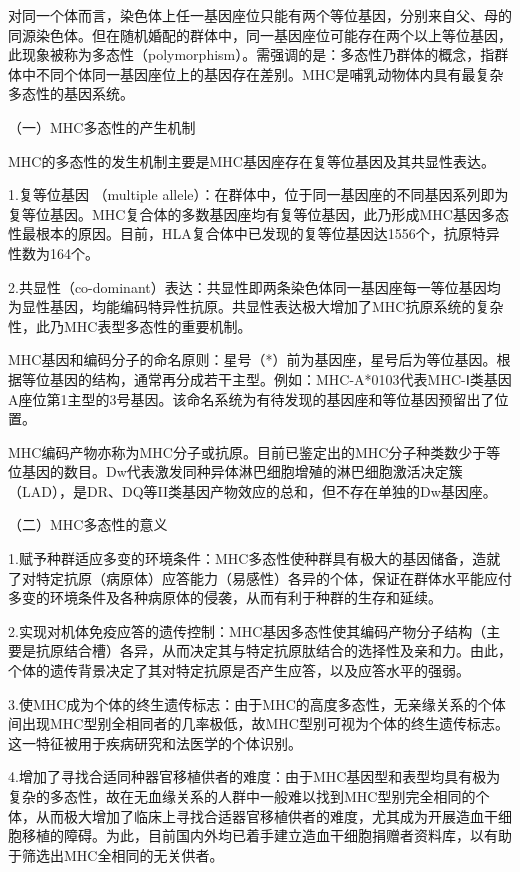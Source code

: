 对同一个体而言，染色体上任一基因座位只能有两个等位基因，分别来自父、母的同源染色体。但在随机婚配的群体中，同一基因座位可能存在两个以上等位基因，此现象被称为多态性（polymorphism）。需强调的是：多态性乃群体的概念，指群体中不同个体同一基因座位上的基因存在差别。MHC是哺乳动物体内具有最复杂多态性的基因系统。

（一）MHC多态性的产生机制

MHC的多态性的发生机制主要是MHC基因座存在复等位基因及其共显性表达。

1.复等位基因 （multiple
allele）：在群体中，位于同一基因座的不同基因系列即为复等位基因。MHC复合体的多数基因座均有复等位基因，此乃形成MHC基因多态性最根本的原因。目前，HLA复合体中已发现的复等位基因达1556个，抗原特异性数为164个。

2.共显性（co-dominant）表达：共显性即两条染色体同一基因座每一等位基因均为显性基因，均能编码特异性抗原。共显性表达极大增加了MHC抗原系统的复杂性，此乃MHC表型多态性的重要机制。

MHC基因和编码分子的命名原则：星号（*）前为基因座，星号后为等位基因。根据等位基因的结构，通常再分成若干主型。例如：MHC-A*0103代表MHC-Ⅰ类基因A座位第1主型的3号基因。该命名系统为有待发现的基因座和等位基因预留出了位置。

MHC编码产物亦称为MHC分子或抗原。目前已鉴定出的MHC分子种类数少于等位基因的数目。Dw代表激发同种异体淋巴细胞增殖的淋巴细胞激活决定簇
（LAD），是DR、DQ等II类基因产物效应的总和，但不存在单独的Dw基因座。

（二）MHC多态性的意义

1.赋予种群适应多变的环境条件：MHC多态性使种群具有极大的基因储备，造就了对特定抗原（病原体）应答能力（易感性）各异的个体，保证在群体水平能应付多变的环境条件及各种病原体的侵袭，从而有利于种群的生存和延续。

2.实现对机体免疫应答的遗传控制：MHC基因多态性使其编码产物分子结构（主要是抗原结合槽）各异，从而决定其与特定抗原肽结合的选择性及亲和力。由此，个体的遗传背景决定了其对特定抗原是否产生应答，以及应答水平的强弱。

3.使MHC成为个体的终生遗传标志：由于MHC的高度多态性，无亲缘关系的个体间出现MHC型别全相同者的几率极低，故MHC型别可视为个体的终生遗传标志。这一特征被用于疾病研究和法医学的个体识别。

4.增加了寻找合适同种器官移植供者的难度：由于MHC基因型和表型均具有极为复杂的多态性，故在无血缘关系的人群中一般难以找到MHC型别完全相同的个体，从而极大增加了临床上寻找合适器官移植供者的难度，尤其成为开展造血干细胞移植的障碍。为此，目前国内外均已着手建立造血干细胞捐赠者资料库，以有助于筛选出MHC全相同的无关供者。



